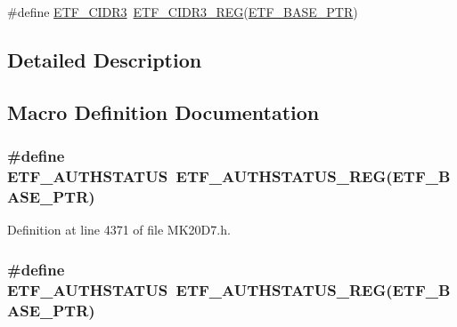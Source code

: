 \begin{DoxyCompactItemize}
\item 
\#define \hyperlink{group___e_t_f___register___accessor___macros_gafb0168c9dc119257f3f16054b469d53d}{E\+T\+F\+\_\+\+C\+I\+D\+R3}~\hyperlink{group___e_t_f___register___accessor___macros_ga30f319179915e151dc415ba158aea9bf}{E\+T\+F\+\_\+\+C\+I\+D\+R3\+\_\+\+R\+EG}(\hyperlink{group___e_t_f___peripheral_ga46da3f879a5311a0651d7908021daa5e}{E\+T\+F\+\_\+\+B\+A\+S\+E\+\_\+\+P\+TR})
\end{DoxyCompactItemize}


\subsection{Detailed Description}


\subsection{Macro Definition Documentation}
\subsubsection[{\texorpdfstring{E\+T\+F\+\_\+\+A\+U\+T\+H\+S\+T\+A\+T\+US}{ETF_AUTHSTATUS}}]{\setlength{\rightskip}{0pt plus 5cm}\#define E\+T\+F\+\_\+\+A\+U\+T\+H\+S\+T\+A\+T\+US~{\bf E\+T\+F\+\_\+\+A\+U\+T\+H\+S\+T\+A\+T\+U\+S\+\_\+\+R\+EG}({\bf E\+T\+F\+\_\+\+B\+A\+S\+E\+\_\+\+P\+TR})}\hypertarget{group___e_t_f___register___accessor___macros_ga137567ddf8def6fd6eb756aebf0f97e2}{}\label{group___e_t_f___register___accessor___macros_ga137567ddf8def6fd6eb756aebf0f97e2}


Definition at line 4371 of file M\+K20\+D7.\+h.

\subsubsection[{\texorpdfstring{E\+T\+F\+\_\+\+A\+U\+T\+H\+S\+T\+A\+T\+US}{ETF_AUTHSTATUS}}]{\setlength{\rightskip}{0pt plus 5cm}\#define E\+T\+F\+\_\+\+A\+U\+T\+H\+S\+T\+A\+T\+US~{\bf E\+T\+F\+\_\+\+A\+U\+T\+H\+S\+T\+A\+T\+U\+S\+\_\+\+R\+EG}({\bf E\+T\+F\+\_\+\+B\+A\+S\+E\+\_\+\+P\+TR})}\hypertarget{group___e_t_f___register___accessor___macros_ga137567ddf8def6fd6eb756aebf0f97e2}{}\label{group___e_t_f___register___accessor___macros_ga137567ddf8def6fd6eb756aebf0f97e2}


